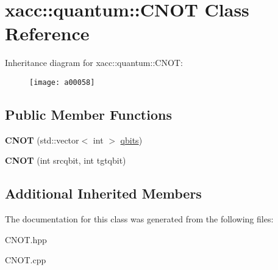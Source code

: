 \hypertarget{a00058}{}\section{xacc\+:\+:quantum\+:\+:C\+N\+OT Class Reference}
\label{a00058}
Inheritance diagram for xacc\+:\+:quantum\+:\+:C\+N\+OT\+:\begin{figure}[H]
\begin{center}
\leavevmode
\texttt{[image: a00058]}
\end{center}
\end{figure}
\subsection*{Public Member Functions}
\begin{DoxyCompactItemize}
\item 
{\bfseries C\+N\+OT} (std\+::vector$<$ int $>$ \hyperlink{a00112_a2a56be6c2519ea65df4d06f4abae1393}{qbits})\hypertarget{a00058_ad3d460779a27affa317dd4f3a88268b3}{}\label{a00058_ad3d460779a27affa317dd4f3a88268b3}

\item 
{\bfseries C\+N\+OT} (int srcqbit, int tgtqbit)\hypertarget{a00058_a15efcb44477dde4b6151fe1776a73ddc}{}\label{a00058_a15efcb44477dde4b6151fe1776a73ddc}

\end{DoxyCompactItemize}
\subsection*{Additional Inherited Members}


The documentation for this class was generated from the following files\+:\begin{DoxyCompactItemize}
\item 
C\+N\+O\+T.\+hpp\item 
C\+N\+O\+T.\+cpp\end{DoxyCompactItemize}
